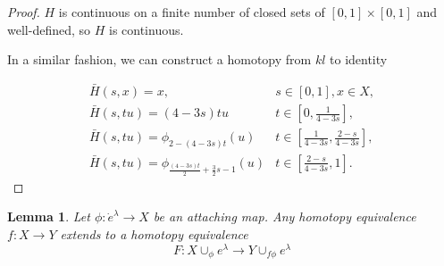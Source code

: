 \documentclass[a4paper,11pt,reqno]{amsart}
\newtheorem{lem}[thm]{Lemma}
\begin{document}
\begin{proof}
  $H$ is continuous on a finite number of closed sets of $[0,1]\times[0,1]$ and
  well-defined, so $H$ is continuous.

  In a similar fashion, we can construct a homotopy from $kl$ to identity

  \begin{equation}
    \begin{array}{lcl}
      \bar{H}(s, x) = x, & s \in [0,1], x \in X,\\
      \bar{H}(s, tu) = (4-3s)tu & t \in [0,\frac{1}{4-3s}], \\
      \bar{H}(s, tu) = \phi_{2-(4-3s)t}(u) &
      t \in [\frac{1}{4-3s},\frac{2-s}{4-3s}], \\
      \bar{H}(s, tu) = \phi_{\frac{(4-3s)t}{2}+\frac{3}{2}s-1}(u) &
      t \in [\frac{2-s}{4-3s},1].
    \end{array}
  \end{equation}


\end{proof}

\begin{lem}
  \label{3.7}
  Let $\phi : \dot{e}^\lambda \to X$ be an attaching map. Any homotopy
  equivalence $f: X \to Y$ extends to a homotopy equivalence
  \begin{equation}
    F: X \cup_\phi e^\lambda \to Y \cup_{f\phi} e^\lambda
  \end{equation}
\end{lem}
\end{document}
